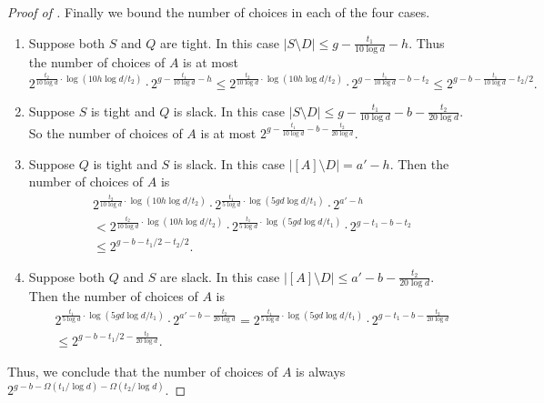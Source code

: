 \documentclass{amsart}
\theoremstyle{definition}
\newcommand{\0}[0]{\emptyset}
\begin{document}
\begin{proof}[Proof of ]
    Finally we bound the number of choices in each of the four cases.
    \begin{enumerate}
        \item Suppose both $S$ and $Q$ are tight. In this case $|S\setminus D|\leq g- \frac{t_1}{10\log d}-h$. Thus the number of choices of $A$ is at most
        \[
        2^{\frac{t_2}{10\log d}\cdot \log(10h\log d/t_2)}\cdot 2^{g- \frac{t_1}{10\log d}-h}\leq 2^{\frac{t_2}{10\log d}\cdot \log(10h\log d/t_2)}\cdot 2^{g- \frac{t_1}{10\log d}-b-t_2}\leq 2^{g-b-\frac{t_1}{10\log d}-t_2/2}.
        \]
        \item Suppose $S$ is tight and $Q$ is slack. In this case $|S\setminus D|\leq g-\frac{t_1}{10\log d}-b-\frac{t_2}{20\log d}$. So the number of choices of $A$ is at most $2^{g-\frac{t_1}{10\log d}-b-\frac{t_2}{20\log d}}$.
        \item Suppose $Q$ is tight and $S$ is slack. In this case $|[A]\setminus D|=a'-h$. Then the number of choices of $A$ is 
        \begin{align*}
            &2^{\frac{t_2}{10\log d}\cdot \log(10h\log d/t_2)}\cdot 2^{\frac{t_1}{5\log d}\cdot \log(5gd\log d/t_1)}\cdot 2^{a'-h}\\
            &< 2^{\frac{t_2}{10\log d}\cdot \log(10h\log d/t_2)}\cdot 2^{\frac{t_1}{5\log d}\cdot \log(5gd\log d/t_1)}\cdot 2^{g-t_1-b-t_2}\\
            &\leq 2^{g-b-t_1/2-t_2/2}.
        \end{align*}
        \item Suppose both $Q$ and $S$ are slack. In this case $|[A]\setminus D|\leq a'-b-\frac{t_2}{20\log d}$. Then the number of choices of $A$ is 
       \begin{align*}
           & 2^{ \frac{t_1}{5\log d}\cdot \log(5gd\log d/t_1)}\cdot 2^{a'-b-\frac{t_2}{20\log d}} = 2^{ \frac{t_1}{5\log d}\cdot \log(5gd\log d/t_1)}\cdot 2^{g-t_1-b-\frac{t_2}{20\log d}}\\
           &\leq 2^{g-b-t_1/2-\frac{t_2}{20\log d}}.
       \end{align*}
    \end{enumerate}
    Thus, we conclude that the number of choices of $A$ is always $2^{g-b-\Omega(t_1/\log d)-\Omega(t_2/\log d)}$.
\end{proof}
\end{document}
